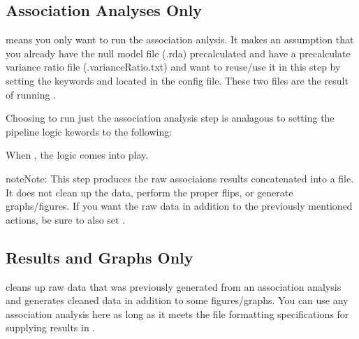 \documentclass[letterpaper,10pt,english]{sphinxmanual}
\begin{document}
\subsection{Association Analyses Only}
\label{\detokenize{exampleWorkFlows:association-analyses-only}}
 means you only want to run the association anlysis.  It makes an assumption that you already have the null model file (.rda) pre\sphinxhyphen{}calculated and have a pre\sphinxhyphen{}calculate variance ratio file (.varianceRatio.txt) and want to re\sphinxhyphen{}use/use it in this step by setting the keywords  and  located in the config file.  These two files are the result of running .

Choosing to run just the association analysis step is analagous to setting the pipeline logic kewords to the following:

\begin{sphinxVerbatim}[commandchars=\\\{\}]
\end{sphinxVerbatim}

When , the  logic comes into play.

\begin{sphinxadmonition}{note}{Note:}
This step produces the raw associaions results concatenated into a file.  It does not clean up the data, perform the proper flips, or generate graphs/figures.  If you want the raw data in addition to the previously mentioned actions, be sure to also set .
\end{sphinxadmonition}


\subsection{Results and Graphs Only}
\label{\detokenize{exampleWorkFlows:results-and-graphs-only}}
 cleans up raw data that was previously generated from an association analysis and generates cleaned data in addition to some figures/graphs.  You can use any association analysis here as long as it meets the file formatting specifications for supplying results in .
\end{document}
